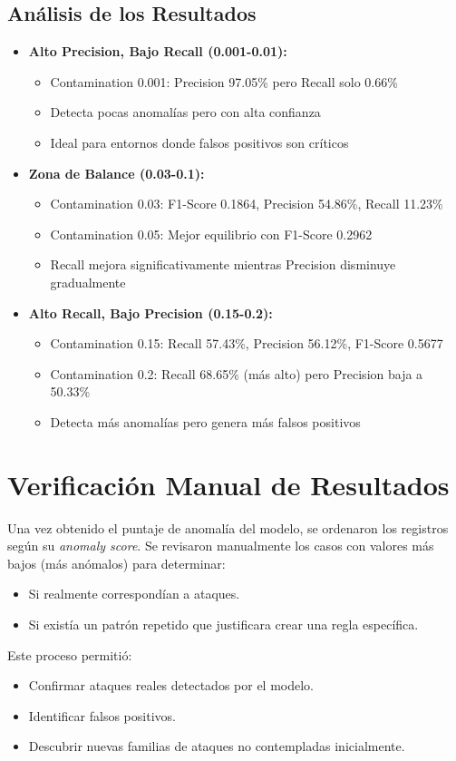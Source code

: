 \documentclass[12pt]{article}
\begin{document}
	\subsection{Análisis de los Resultados}
	
	\begin{itemize}
		\item \textbf{Alto Precision, Bajo Recall (0.001-0.01):} 
		\begin{itemize}
			\item Contamination 0.001: Precision 97.05\% pero Recall solo 0.66\%
			\item Detecta pocas anomalías pero con alta confianza
			\item Ideal para entornos donde falsos positivos son críticos
		\end{itemize}
		
		\item \textbf{Zona de Balance (0.03-0.1):}
		\begin{itemize}
			\item Contamination 0.03: F1-Score 0.1864, Precision 54.86\%, Recall 11.23\%
			\item Contamination 0.05: Mejor equilibrio con F1-Score 0.2962
			\item Recall mejora significativamente mientras Precision disminuye gradualmente
		\end{itemize}
		
		\item \textbf{Alto Recall, Bajo Precision (0.15-0.2):}
		\begin{itemize}
			\item Contamination 0.15: Recall 57.43\%, Precision 56.12\%, F1-Score 0.5677
			\item Contamination 0.2: Recall 68.65\% (más alto) pero Precision baja a 50.33\%
			\item Detecta más anomalías pero genera más falsos positivos
		\end{itemize}
	\end{itemize}
	
	\section{Verificación Manual de Resultados}
	 Una vez obtenido el puntaje de anomalía del modelo, se ordenaron los registros según su \textit{anomaly score}. Se revisaron manualmente los casos con valores más bajos (más anómalos) para determinar:
	  \begin{itemize}
	  	 \item Si realmente correspondían a ataques. 
	  	 \item Si existía un patrón repetido que justificara crear una regla específica. 
	  \end{itemize} 
	  Este proceso permitió: \begin{itemize}
	  	 \item Confirmar ataques reales detectados por el modelo.
	  	  \item Identificar falsos positivos. 
	  	  \item Descubrir nuevas familias de ataques no contempladas inicialmente. 
	  	  \end{itemize} 
\end{document}
